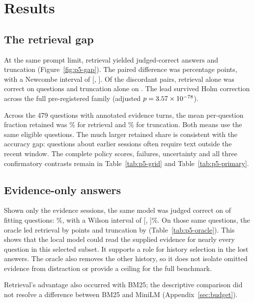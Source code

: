 \documentclass[11pt,letterpaper]{article}
\begin{document}
\section{Results}
\label{sec:results}

\subsection{The retrieval gap}
\label{sec:gap}
At the same prompt limit, retrieval yielded \PfCorrectMFour{} judged-correct
answers and truncation \PfCorrectTFour{} (Figure~\ref{fig:p5-gap}). The
paired difference was \PfDiffMvT{} percentage points, with a Newcombe interval
of [\PfDiffLoMvT, \PfDiffHiMvT]. Of the discordant pairs, retrieval alone was
correct on \PfArmOnlyMvT{} questions and truncation alone on
\PfRefOnlyMvT{}. The lead survived Holm correction across the full
pre-registered family (adjusted $p=3.57\times10^{-78}$).

Across the 479 questions with annotated evidence turns, the mean per-question
fraction retained was \PfDiagEvidenceTurnsKeptMFour\% for retrieval and
\PfDiagEvidenceTurnsKeptTFour\% for truncation. Both means use the same eligible
questions. The much larger retained share is consistent with the accuracy
gap: questions about earlier sessions often require text outside the recent
window. The complete policy scores, failures, uncertainty and all three
confirmatory contrasts remain in Table~\ref{tab:p5-grid} and
Table~\ref{tab:p5-primary}.

\subsection{Evidence-only answers}
\label{sec:oracle-main}
Shown only the evidence sessions, the same model was judged correct on
\PfCorrectOFour{} of \PfNOFour{} fitting questions: \PfAccOFour\%, with a
Wilson interval of [\PfAccLoOFour, \PfAccHiOFour]\%. On those same questions,
the oracle led retrieval by \PfOracleGapM{} points and truncation by
\PfOracleGapT{} (Table~\ref{tab:p5-oracle}). This shows that the local model
could read the supplied evidence for nearly every question in this selected
subset. It supports a role for history selection in the lost answers. The
oracle also removes the other history, so it does not isolate omitted evidence
from distraction or provide a ceiling for the full benchmark.

Retrieval's advantage also occurred with BM25; the descriptive comparison did
not resolve a difference between BM25 and MiniLM (Appendix~\ref{sec:budget}).
\end{document}
